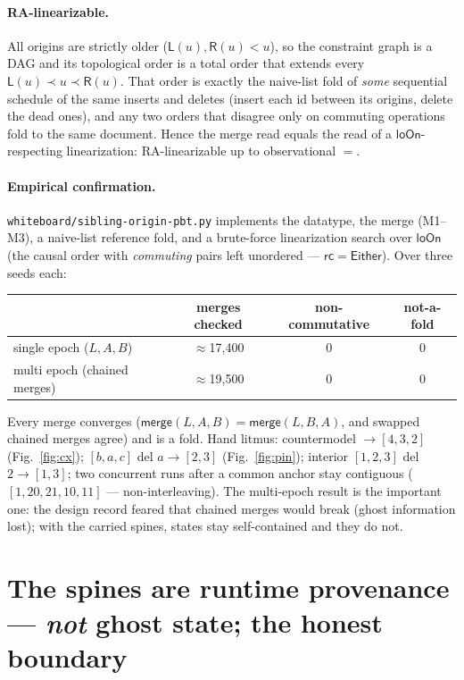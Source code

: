 \documentclass[11pt]{article}
\newcommand{\lo}{\mathsf{L}}
\newcommand{\ro}{\mathsf{R}}
\newcommand{\mrg}{\mathsf{merge}}
\newcommand{\lca}{L}
\begin{document}
\paragraph{RA-linearizable.} All origins are strictly older ($\lo(u),\ro(u)<u$),
so the constraint graph is a DAG and its topological order is a total order that
extends every $\lo(u)\prec u\prec\ro(u)$. That order is exactly the naive-list
fold of \emph{some} sequential schedule of the same inserts and deletes (insert
each id between its origins, delete the dead ones), and any two orders that
disagree only on commuting operations fold to the same document. Hence the merge
read equals the read of a $\mathsf{loOn}$-respecting linearization: RA-linearizable
up to observational $=$.

\paragraph{Empirical confirmation.} \texttt{whiteboard/sibling-origin-pbt.py}
implements the datatype, the merge (M1--M3), a naive-list reference fold, and a
brute-force linearization search over $\mathsf{loOn}$ (the causal order with
\emph{commuting} pairs left unordered --- $\mathsf{rc}=\mathsf{Either}$). Over
three seeds each:
\begin{center}
\begin{tabular}{lccc}
\hline
 & merges checked & non-commutative & not-a-fold \\
\hline
single epoch ($\lca,A,B$)      & $\approx$17{,}400 & 0 & 0 \\
multi epoch (chained merges)   & $\approx$19{,}500 & 0 & 0 \\
\hline
\end{tabular}
\end{center}
Every merge converges ($\mrg(\lca,A,B)=\mrg(\lca,B,A)$, and swapped chained
merges agree) and is a fold. Hand litmus: countermodel $\to[4,3,2]$
(Fig.~\ref{fig:cx}); $[b,a,c]$ del $a\to[2,3]$ (Fig.~\ref{fig:pin}); interior
$[1,2,3]$ del $2\to[1,3]$; two concurrent runs after a common anchor stay
contiguous ($[1,20,21,10,11]$ --- non-interleaving). The multi-epoch result is
the important one: the design record feared that chained merges would break
(ghost information lost); with the carried spines, states stay self-contained and
they do not.

\section{The spines are runtime provenance --- \emph{not} ghost state; the honest boundary}
\end{document}
